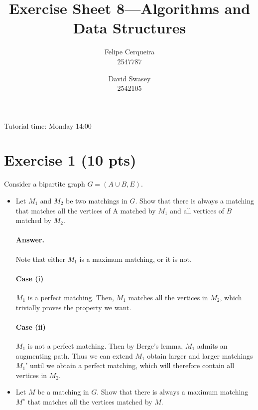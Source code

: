 \documentclass[a4paper]{article}
\title{Exercise Sheet 8---Algorithms and Data Structures}
\author{Felipe Cerqueira \\ 2547787 \and David Swasey \\ 2542105}
\begin{document}
\maketitle

Tutorial time: Monday 14:00

\section*{Exercise 1 (10 pts)}

Consider a bipartite graph $G = (A \cup B, E)$.
\begin{itemize}
\item Let $M_1$ and $M_2$ be two matchings in $G$. Show that there is always a matching that matches all the vertices of A matched by $M_1$ and all vertices of $B$ matched by $M_2$.

\paragraph{Answer.} Note that either $M_1$ is a maximum matching, or it is not.

\paragraph{Case (i)} $M_1$ is a perfect matching. Then, $M_1$ matches all the vertices in $M_2$, which trivially proves the property we want.

\paragraph{Case (ii)} $M_1$ is not a perfect matching. Then by Berge's lemma, $M_1$ admits an augmenting path. Thus we can extend $M_1$ obtain larger and larger matchings $M_1'$ until we obtain a perfect matching, which will therefore contain all vertices in $M_2$.%


\bigskip

\item Let $M$ be a matching in $G$. Show that there is always a maximum matching $M^∗$ that matches all the vertices matched by $M$.


\end{itemize}
\end{document}
